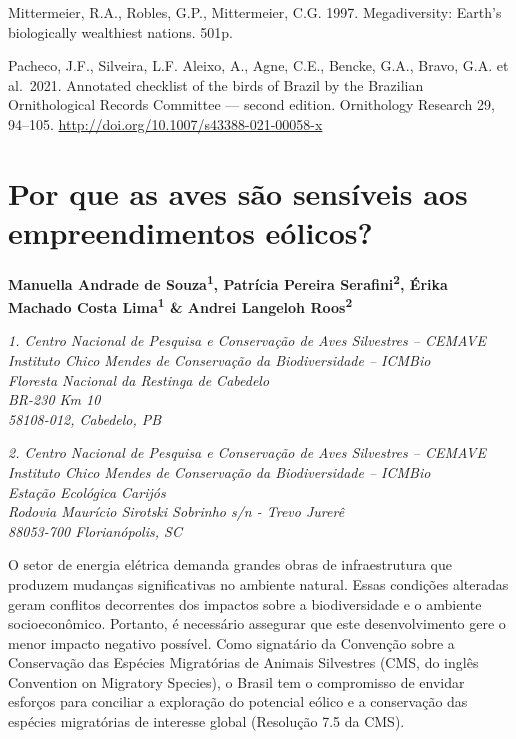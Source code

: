 \documentclass[
  oneside]{scrbook}
\begin{document}
Mittermeier, R.A., Robles, G.P., Mittermeier, C.G. 1997. Megadiversity: Earth's biologically wealthiest nations. 501p.

Pacheco, J.F., Silveira, L.F. Aleixo, A., Agne, C.E., Bencke, G.A., Bravo, G.A. et al.~2021. Annotated checklist of the birds of Brazil by the Brazilian Ornithological Records Committee --- second edition. Ornithology Research 29, 94--105. \url{http://doi.org/10.1007/s43388-021-00058-x}

\hypertarget{cap4}{%
\chapter{Por que as aves são sensíveis aos empreendimentos eólicos?}\label{cap4}}

\pagestyle{headings}

\textbf{Manuella Andrade de Souza\textsuperscript{1}, Patrícia Pereira Serafini\textsuperscript{2}, Érika Machado Costa Lima\textsuperscript{1} \& Andrei Langeloh Roos\textsuperscript{2}}

\emph{1. Centro Nacional de Pesquisa e Conservação de Aves Silvestres -- CEMAVE}\\
\emph{Instituto Chico Mendes de Conservação da Biodiversidade -- ICMBio}\\
\emph{Floresta Nacional da Restinga de Cabedelo}\\
\emph{BR-230 Km 10}\\
\emph{58108-012, Cabedelo, PB}

\emph{2. Centro Nacional de Pesquisa e Conservação de Aves Silvestres -- CEMAVE}\\
\emph{Instituto Chico Mendes de Conservação da Biodiversidade -- ICMBio}\\
\emph{Estação Ecológica Carijós}\\
\emph{Rodovia Maurício Sirotski Sobrinho s/n - Trevo Jurerê}\\
\emph{88053-700 Florianópolis, SC}

O setor de energia elétrica demanda grandes obras de infraestrutura que produzem mudanças significativas no ambiente natural. Essas condições alteradas geram conflitos decorrentes dos impactos sobre a biodiversidade e o ambiente socioeconômico. Portanto, é necessário assegurar que este desenvolvimento gere o menor impacto negativo possível. Como signatário da Convenção sobre a Conservação das Espécies Migratórias de Animais Silvestres (CMS, do inglês Convention on Migratory Species), o Brasil tem o compromisso de envidar esforços para conciliar a exploração do potencial eólico e a conservação das espécies migratórias de interesse global (Resolução 7.5 da CMS).
\end{document}
